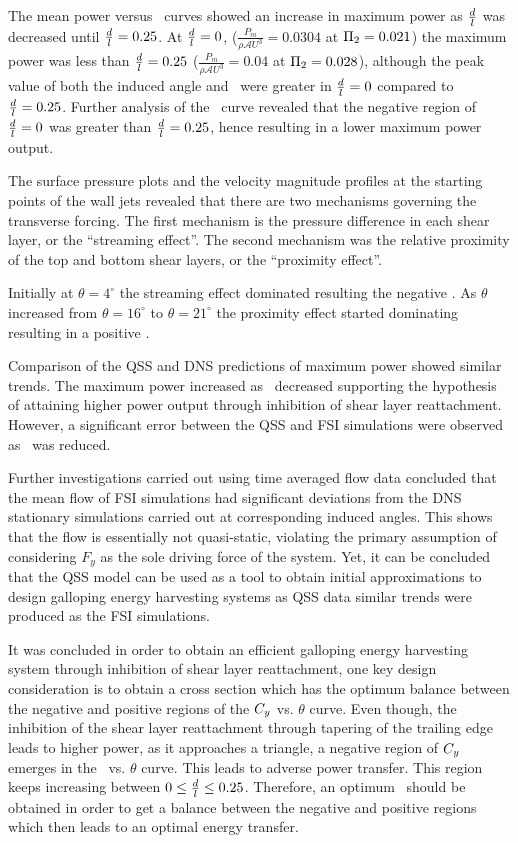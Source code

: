  The mean power versus \massdamp\ curves showed an increase in maximum power as $\frac{d}{l}$ was decreased until $\frac{d}{l}=0.25$. At $\frac{d}{l}=0$,  ($\displaystyle\frac{P_{m}}{\rho \mathcal{A}U^3}=0.0304$ at $\Pi_2=0.021$) the maximum power was less than $\frac{d}{l}=0.25$ ($\displaystyle\frac{P_{m}}{\rho \mathcal{A}U^3}=0.04$ at $\Pi_2=0.028$), although the peak value of both the induced angle and \cy\ were greater in $\frac{d}{l}=0$ compared to $\frac{d}{l}=0.25$. Further analysis of the \cy\ curve revealed that the negative region of $\frac{d}{l}=0$  was greater than $\frac{d}{l}=0.25$, hence resulting in a lower maximum power output. 
 
 The surface pressure plots and the velocity magnitude profiles at the starting points of the wall jets revealed  that there are two mechanisms governing the transverse forcing. The first mechanism is the pressure difference in each shear layer, or the ``streaming effect''. The second mechanism was the relative proximity of the top and bottom shear layers, or the ``proximity effect''.
 
 Initially at $\theta= 4^{\circ}$ the streaming effect dominated resulting the negative \cy. As $\theta$ increased from  $\theta= 16^{\circ}$ to  $\theta= 21^{\circ}$ the proximity effect started dominating resulting in a positive \cy.
 
 Comparison of the QSS and DNS predictions of maximum power showed similar trends. The maximum power increased as \ratio\  decreased supporting the hypothesis of attaining higher power output through inhibition of shear layer reattachment. However, a significant error between the QSS and FSI simulations were observed as \ratio\ was reduced. 
 
 Further investigations carried out using time averaged flow data concluded that the mean flow of FSI simulations had significant deviations from the DNS stationary simulations carried out at corresponding induced angles. This shows that the flow is essentially not quasi-static, violating the primary assumption of considering $F_y$ as the sole driving force of the system. Yet, it can be concluded that the QSS model can be used as a tool to obtain initial approximations to design galloping energy harvesting systems as QSS data similar trends were produced as the FSI simulations.
 
 It was concluded in order to obtain an efficient galloping energy harvesting system through inhibition of shear layer reattachment, one key design consideration is to obtain a cross section which has the optimum balance between the negative and positive regions of the $C_{y}$ vs. $\theta$ curve. Even though, the inhibition of  the shear layer reattachment through tapering of the trailing edge leads to higher power, as it approaches a triangle, a negative region of $C_{y}$ emerges in the \cy\ vs. $\theta$ curve. This leads to adverse power transfer. This region keeps increasing between $0\leq\frac{d}{l}\leq0.25$. Therefore, an optimum \ratio\ should be obtained in order to get a balance between the negative and positive regions which  then leads to an optimal energy transfer. 
 
